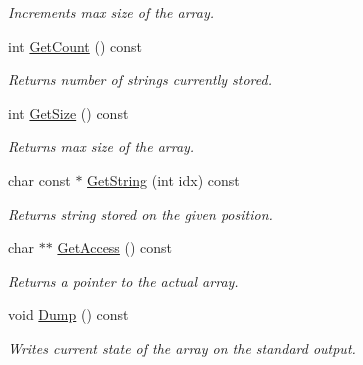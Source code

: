 \begin{DoxyCompactItemize}
\begin{DoxyCompactList}\small\item\em Increments max size of the array. \end{DoxyCompactList}\item 
\hypertarget{class_common_1_1_string_array_a002183552b3ef269d2b125c5d0b8c29b}{int \hyperlink{class_common_1_1_string_array_a002183552b3ef269d2b125c5d0b8c29b}{Get\-Count} () const }\label{class_common_1_1_string_array_a002183552b3ef269d2b125c5d0b8c29b}

\begin{DoxyCompactList}\small\item\em Returns number of strings currently stored. \end{DoxyCompactList}\item 
\hypertarget{class_common_1_1_string_array_ac1a9dc768595ac18c99d1e55dc649881}{int \hyperlink{class_common_1_1_string_array_ac1a9dc768595ac18c99d1e55dc649881}{Get\-Size} () const }\label{class_common_1_1_string_array_ac1a9dc768595ac18c99d1e55dc649881}

\begin{DoxyCompactList}\small\item\em Returns max size of the array. \end{DoxyCompactList}\item 
\hypertarget{class_common_1_1_string_array_a8e002e159ee545b3f86261c6f2e46f6c}{char const $\ast$ \hyperlink{class_common_1_1_string_array_a8e002e159ee545b3f86261c6f2e46f6c}{Get\-String} (int idx) const }\label{class_common_1_1_string_array_a8e002e159ee545b3f86261c6f2e46f6c}

\begin{DoxyCompactList}\small\item\em Returns string stored on the given position. \end{DoxyCompactList}\item 
\hypertarget{class_common_1_1_string_array_ad0303b1e68365d514e9f8b494dfde816}{char $\ast$$\ast$ \hyperlink{class_common_1_1_string_array_ad0303b1e68365d514e9f8b494dfde816}{Get\-Access} () const }\label{class_common_1_1_string_array_ad0303b1e68365d514e9f8b494dfde816}

\begin{DoxyCompactList}\small\item\em Returns a pointer to the actual array. \end{DoxyCompactList}\item 
\hypertarget{class_common_1_1_string_array_ad40acc64b2550db997c23a1890ce117f}{void \hyperlink{class_common_1_1_string_array_ad40acc64b2550db997c23a1890ce117f}{Dump} () const }\label{class_common_1_1_string_array_ad40acc64b2550db997c23a1890ce117f}

\begin{DoxyCompactList}\small\item\em Writes current state of the array on the standard output. \end{DoxyCompactList}\end{DoxyCompactItemize}


